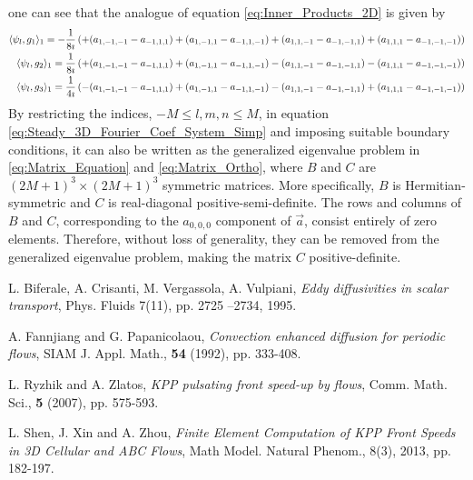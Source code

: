 \documentclass{article}
\newcommand{\0}{\mathbf{0}}
\newcommand{\1}{\mathbf{1}}
\newcommand{\2}{\mathbf{2}}
\newcommand{\3}{\mathbf{3}}
\newcommand{\4}{\mathbf{4}}
\newcommand{\5}{\mathbf{5}}
\newcommand{\6}{\mathbf{6}}
\newcommand{\7}{\mathbf{7}}
\newcommand{\8}{\mathbf{8}}
\begin{document}
one can see that the analogue of equation \eqref{eq:Inner_Products_2D}
is given by 
%
\begin{align}\label{eq:Inner_Products_3D}
  \langle\psi_l,g_1\rangle_1=-\frac{1}{8\imath}&\left( +(a_{1,-1,-1}-a_{-1,1,1})
                              +(a_{1,-1,1}-a_{-1,1,-1})
                              +(a_{1,1,-1}-a_{-1,-1,1})
                              +(a_{1,1,1}-a_{-1,-1,-1})
  \right)               
              \notag\\
  \langle\psi_l,g_2\rangle_1=\frac{1}{8\imath}&\left( +(a_{1,-1,-1}-a_{-1,1,1})
                             +(a_{1,-1,1}-a_{-1,1,-1})
                             -(a_{1,1,-1}-a_{-1,-1,1})
                             -(a_{1,1,1}-a_{-1,-1,-1})
  \right)               
               \notag\\
  \langle\psi_l,g_3\rangle_1=\frac{1}{4\imath}&\left( -(a_{1,-1,-1}-a_{-1,1,1})
                             +(a_{1,-1,1}-a_{-1,1,-1})
                             -(a_{1,1,-1}-a_{-1,-1,1})
                             +(a_{1,1,1}-a_{-1,-1,-1})
  \right)               
\end{align}
%
By restricting the indices, $-M\leq l,m,n\leq M$, in equation
\eqref{eq:Steady_3D_Fourier_Coef_System_Simp} and imposing suitable
boundary conditions, it can also be written as the generalized
eigenvalue problem in \eqref{eq:Matrix_Equation} and
\eqref{eq:Matrix_Ortho}, where  $B$ and $C$ are $(2M+1)^3\times(2M+1)^3$
symmetric matrices. More specifically, $B$ is Hermitian-symmetric and
$C$ is real-diagonal positive-semi-definite. The rows and
columns of $B$ and $C$, corresponding to the $a_{0,0,0}$ component of
$\vec{a}$, consist entirely of zero elements. Therefore, without loss
of generality, they can be removed from the generalized eigenvalue
problem, making the matrix $C$ positive-definite.  





\begin{thebibliography}{99}

L. Biferale, A. Crisanti, M. Vergassola, A. Vulpiani,
{\em Eddy diffusivities in scalar transport}, Phys. Fluids 7(11), pp. 2725 --2734, 1995.

 A. Fannjiang and G. Papanicolaou,
{\em Convection enhanced diffusion for periodic flows}, SIAM J.
Appl. Math., {\bf 54} (1992), pp. 333-408.

L. Ryzhik and A. Zlatos,
{\em KPP pulsating front speed-up by flows}, Comm. Math. Sci., {\bf
5} (2007), pp. 575-593.

L. Shen, J. Xin and A. Zhou, {\em Finite Element Computation of KPP
Front Speeds in 3D Cellular and ABC Flows}, Math Model. Natural Phenom., 8(3), 2013, pp. 182-197. 




\end{thebibliography}
\end{document}

